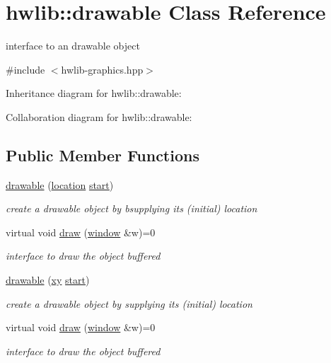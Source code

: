 \hypertarget{classhwlib_1_1drawable}{}\section{hwlib\+:\+:drawable Class Reference}
\label{classhwlib_1_1drawable}


interface to an drawable object  




{\ttfamily \#include $<$hwlib-\/graphics.\+hpp$>$}



Inheritance diagram for hwlib\+:\+:drawable\+:


Collaboration diagram for hwlib\+:\+:drawable\+:
\subsection*{Public Member Functions}
\begin{DoxyCompactItemize}
\item 
\mbox{\label{classhwlib_1_1drawable_a48f84ea64249fe67f726e9631d149d66}} 
\hyperlink{classhwlib_1_1drawable_a48f84ea64249fe67f726e9631d149d66}{drawable} (\hyperlink{classhwlib_1_1location}{location} \hyperlink{classhwlib_1_1drawable_a6c31bc9303840a4317d3c95250c357ce}{start})
\begin{DoxyCompactList}\small\item\em create a drawable object by bsupplying its (initial) location \end{DoxyCompactList}\item 
virtual void \hyperlink{classhwlib_1_1drawable_ac9ea0de52a14d9024cb34110f794ac28}{draw} (\hyperlink{classhwlib_1_1window}{window} \&w)=0
\begin{DoxyCompactList}\small\item\em interface to draw the object buffered \end{DoxyCompactList}\item 
\mbox{\label{classhwlib_1_1drawable_a0cd21b5481bb137cd2fbcae1a7ee304e}} 
\hyperlink{classhwlib_1_1drawable_a0cd21b5481bb137cd2fbcae1a7ee304e}{drawable} (\hyperlink{classhwlib_1_1xy}{xy} \hyperlink{classhwlib_1_1drawable_a6c31bc9303840a4317d3c95250c357ce}{start})
\begin{DoxyCompactList}\small\item\em create a drawable object by supplying its (initial) location \end{DoxyCompactList}\item 
virtual void \hyperlink{classhwlib_1_1drawable_ac9ea0de52a14d9024cb34110f794ac28}{draw} (\hyperlink{classhwlib_1_1window}{window} \&w)=0
\begin{DoxyCompactList}\small\item\em interface to draw the object buffered \end{DoxyCompactList}\end{DoxyCompactItemize}
